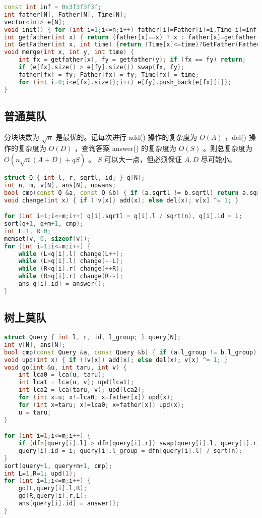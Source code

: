 \documentclass[landscape,a4paper]{article}
\begin{document}
\begin{lstlisting}[language=C++]
const int inf = 0x3f3f3f3f;
int father[N], Father[N], Time[N];
vector<int> e[N];
void init() { for (int i=1;i<=n;i++) father[i]=Father[i]=i,Time[i]=inf,e[i].clear(),e[i].push_back(i);}
int getfather(int x) { return (father[x]==x) ? x : father[x]=getfather(father[x]); }
int GetFather(int x, int time) {return (Time[x]<=time)?GetFather(Father[x],time):x;}
void merge(int x, int y, int time) {
	int fx = getfather(x), fy = getfather(y); if (fx == fy) return;
	if (e[fx].size() > e[fy].size()) swap(fx, fy);
	father[fx] = fy; Father[fx] = fy; Time[fx] = time;
	for (int i=0;i<e[fx].size();i++) e[fy].push_back(e[fx][i]);
}
\end{lstlisting}

\subsection{普通莫队}

分块块数为 $\sqrt{n}$ 是最优的。记每次进行 add() 操作的复杂度为 $O(A)$ ，del() 操作的复杂度为 $O(D)$ ，查询答案 answer() 的复杂度为 $O(S)$ 。则总复杂度为 $O(n \sqrt{n} (A + D) + qS)$ 。 $S$ 可以大一点，但必须保证 $A, D$ 尽可能小。

\begin{lstlisting}[language=C++]
struct Q { int l, r, sqrtl, id; } q[N];
int n, m, v[N], ans[N], nowans;
bool cmp(const Q &a, const Q &b) { if (a.sqrtl != b.sqrtl) return a.sqrtl < b.sqrtl; return a.r < b.r; }
void change(int x) { if (!v[x]) add(x); else del(x); v[x] ^= 1; }

for (int i=1;i<=m;i++) q[i].sqrtl = q[i].l / sqrt(n), q[i].id = i;
sort(q+1, q+m+1, cmp);
int L=1, R=0;
memset(v, 0, sizeof(v));
for (int i=1;i<=m;i++) {
	while (L<q[i].l) change(L++);
	while (L>q[i].l) change(--L);
	while (R<q[i].r) change(++R);
	while (R>q[i].r) change(R--);
	ans[q[i].id] = answer();
}
\end{lstlisting}
\subsection{树上莫队}

\begin{lstlisting}[language=C++]
struct Query { int l, r, id, l_group; } query[N];
int v[N], ans[N];
bool cmp(const Query &a, const Query &b) { if (a.l_group != b.l_group) return a.l_group < b.l_group; return dfn[a.r] < dfn[b.r]; }
void upd(int x) { if (!v[x]) add(x); else del(x); v[x] ^= 1; }
void go(int &u, int taru, int v) {
	int lca0 = lca(u, taru);
	int lca1 = lca(u, v); upd(lca1);
	int lca2 = lca(taru, v); upd(lca2);
	for (int x=u; x!=lca0; x=father[x]) upd(x);
	for (int x=taru; x!=lca0; x=father[x]) upd(x);
	u = taru;
}

for (int i=1;i<=m;i++) {
	if (dfn[query[i].l] > dfn[query[i].r]) swap(query[i].l, query[i].r);
	query[i].id = i; query[i].l_group = dfn[query[i].l] / sqrt(n);
}
sort(query+1, query+m+1, cmp);
int L=1,R=1; upd(1);
for (int i=1;i<=m;i++) {
	go(L,query[i].l,R);
	go(R,query[i].r,L);
	ans[query[i].id] = answer();
}
\end{lstlisting}
\end{document}
